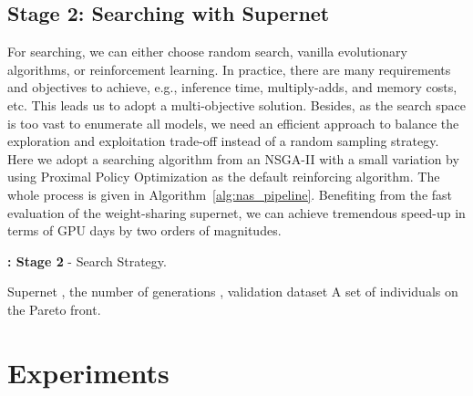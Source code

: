 \documentclass[10pt,twocolumn,letterpaper]{article}
\theoremstyle{definition}
\begin{document}
\subsection{Stage 2: Searching with Supernet}\label{sec:search}


For searching, we can either choose random search, vanilla evolutionary algorithms, or reinforcement learning. In practice, there are many requirements and objectives to achieve, e.g., inference time, multiply-adds, and memory costs, etc. This leads us to adopt a multi-objective solution. Besides, as the search space is too vast to enumerate all models, we need an efficient approach to balance the exploration and exploitation trade-off instead of a random sampling strategy. Here we adopt a searching algorithm from an NSGA-II \cite{deb2002fast} with a small variation by using Proximal Policy Optimization \cite{schulman2017proximal} as the default reinforcing algorithm.  The whole process is given in Algorithm~\ref{alg:nas_pipeline}.
Benefiting from the fast evaluation of the weight-sharing supernet, we can achieve tremendous speed-up in terms of GPU days by two orders of magnitudes.  

















\begin{algorithm}[tb]
	\caption{\textbf{: Stage 2} - Search Strategy.}
	\label{alg:nas_pipeline}
	\begin{algorithmic}
		 Supernet , the number of generations , validation dataset 
		 A set of  individuals on the Pareto front.
		\STATE{}
		\FORALL { }
		\ENDFOR
		\STATE {}
		\STATE {}
		\STATE { }
		\ENDFOR
	\end{algorithmic}
\end{algorithm}



\section{Experiments}
\end{document}
